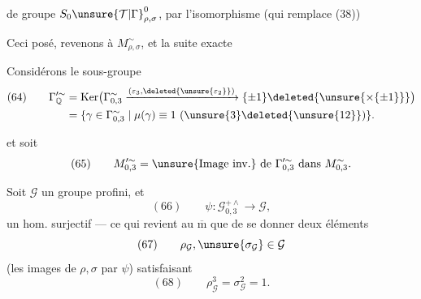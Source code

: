 

de groupe   $S_0\unsure{\mathcal{T}|\Gamma}_{\rho,\sigma}^{0}$, par l'isomorphisme (qui remplace (38))

Ceci posé, revenons à $M_{\rho,\sigma}^{\sim}$, et la suite exacte

Considérons le sous-groupe
\[
\begin{aligned}
(64)\qquad
\Gamma_{\mathbb Q}^{\prime\sim}
 &= \operatorname{Ker}\bigl(\Gamma_{0,3}^{\sim}
 \xrightarrow{(\varepsilon_3,\deleted{\unsure{\varepsilon_2}})}
 \{\pm1\}\deleted{\unsure{\times\{\pm1\}}}\bigr)\\
 &= \{\gamma\in\Gamma_{0,3}^{\sim}\mid\mu(\gamma)\equiv1\ (\unsure{3}\deleted{\unsure{12}})\}.
\end{aligned}
\]

et soit 
\[
 (65)\qquad M_{0,3}^{\prime\sim}
 = \text{\unsure{Image inv.} de }\Gamma_{0,3}^{\prime\sim}\text{ dans }M_{0,3}^{\sim}.
\]

Soit $\mathcal{G}$ un groupe profini, et
\[
 (66)\qquad\psi:\mathcal{G}_{0,3}^{+\wedge}\longrightarrow\mathcal{G},
\]
un hom.  surjectif --- ce qui revient au $\overline{\mathrm m}$ que de se donner deux éléments
\[
 (67)\qquad\rho_{\mathcal{G}},\unsure{\sigma_{\mathcal{G}}}\in\mathcal{G}
\]
(les images de $\rho,\sigma$ par $\psi$) satisfaisant
\[
 (68)\qquad\rho_{\mathcal{G}}^3=\sigma_{\mathcal{G}}^2=1.
\]



